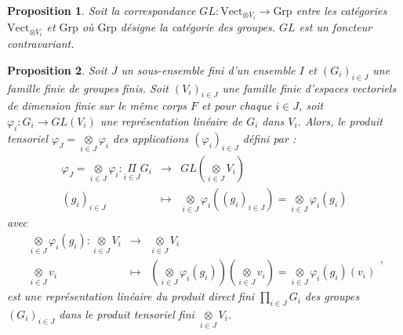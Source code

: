 \documentclass[9pt]{beamer}
\newtheorem{proposition}{Proposition}
\begin{document}
\begin{frame}
\begin{proposition}
	Soit la correspondance \( GL : \text{Vect}_{\otimes V_i} \rightarrow \text{Grp} \) entre les catégories 
	\( \text{Vect}_{\otimes V_i} \) et \( \text{Grp} \) où \( \text{Grp} \) désigne la catégorie des groupes. \( GL \) est un foncteur contravariant.
	
\end{proposition}

	\begin{proposition}
Soit $J$ un sous-ensemble fini d'un ensemble $I$ et $(G_i)_{i\in J}$ une famille finie de groupes finis. Soit $(V_i)_{i\in J}$ une famille finie d'espaces vectoriels de dimension finie sur le même corps $F$ et pour chaque $i \in J$, soit $\varphi_i: G_i\rightarrow GL(V_i)$ une représentation linéaire de $G_i$ dans $V_i$. Alors, le produit tensoriel $\varphi_{J}= \underset{i\in J}\otimes \varphi_i$ des applications $(\varphi_i)_{i\in J}$ défini par : 
	$$\begin{array}{llll}
		\varphi_{J}= \underset{i\in J}\otimes \varphi_i: \underset{i\in J}\Pi G_i&\longrightarrow& GL(\underset{i\in J}\otimes V_i)\\ 
		(g_i)_{i\in J}&\longmapsto& \underset{i\in J}\otimes \varphi_i ((g_i)_{i\in J})= \underset{i\in J}\otimes \varphi_i(g_i)                                                                                                                                                                                                         
	\end{array}
	$$ 
	avec
	$$\begin{array}{rlll} 
		\underset{i\in J}\otimes \varphi_i(g_i): \underset{i\in J}\otimes V_i&\longrightarrow& \underset{i\in J}\otimes V_i\\
		\underset{i\in J}\otimes v_i&\longmapsto&(\underset{i\in J}\otimes \varphi_i(g_i))(\underset{i\in J}\otimes v_i)=\underset{i\in J}\otimes \varphi_i(g_i)(v_i)
	\end{array} 
	,$$ est une représentation linéaire du produit direct fini $\underset{i\in J}\prod G_i$ des groupes $(G_i)_{i\in J}$ dans le produit tensoriel fini $\underset{i\in J}\otimes V_i$.
\end{proposition}

\end{frame}
\end{document}
